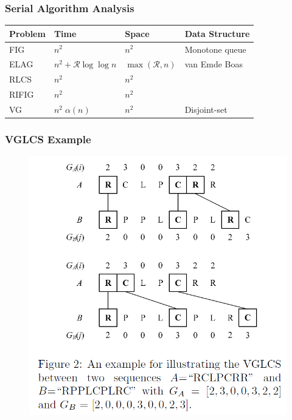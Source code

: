 \begin{frame}
    \frametitle{Serial Algorithm Analysis}
    \begin{center}
        \begin{tabular}{l l l l}
            \hline
            Problem & Time  & Space     & Data Structure \\ \hline
            FIG     & $n^2$                 & $n^2$ & Monotone queue \\ \hline
            ELAG    & $n^2 + \mathcal{R} \log \log n$   & $\max(\mathcal{R}, n)$ & van Emde Boas\\ \hline
            RLCS    & $n^2$                 & $n^2$ & \\ \hline
            RIFIG   & $n^2$                 & $n^2$ & \\ \hline
            VG      & $n^2 \; \alpha(n)$    & $n^2$     & Disjoint-set\\ \hline
        \end{tabular}
    \end{center}
\end{frame}

\begin{frame}
    \frametitle{VGLCS Example}
    \begin{figure}
        \includegraphics[scale=0.3]{figure/fig-VGLCS-ex.png}
    \end{figure}
\end{frame}

